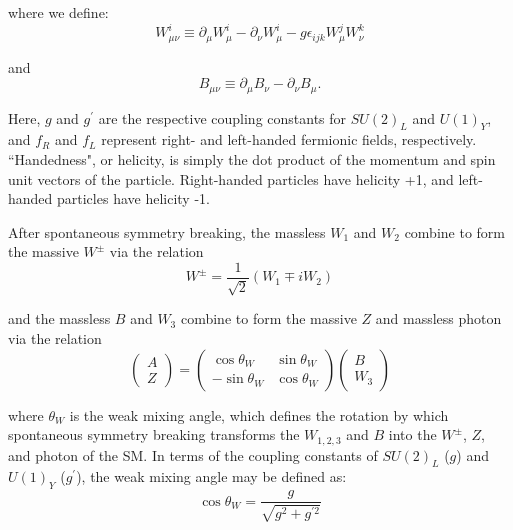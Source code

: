 \noindent where we define:
\begin{equation}
W^{i}_{\mu\nu} \equiv \partial_{\mu}W^{i}_{\mu} - \partial_{\nu}W^{i}_{\mu} - g\epsilon_{ijk}W^{j}_{\mu}W^{k}_{\nu}
\end{equation}

\noindent and
\begin{equation}
B_{\mu\nu} \equiv \partial_{\mu}B_{\nu} - \partial_{\nu}B_{\mu}.
\end{equation}

Here, $g$ and $g^{\prime}$ are the respective coupling constants for $SU(2)_{L}$ and $U(1)_{Y}$, and $f_{R}$ and $f_{L}$ represent right- and left-handed fermionic fields, respectively. ``Handedness", or helicity, is simply the dot product of the momentum and spin unit vectors of the particle. Right-handed particles have helicity +1, and left-handed particles have helicity -1.

After spontaneous symmetry breaking, the massless $W_{1}$ and $W_{2}$ combine to form the massive $W^{\pm}$ via the relation
\begin{equation}
W^{\pm} = \frac{1}{\sqrt{2}}\left(W_{1} \mp iW_{2}\right)
\end{equation}

\noindent and the massless $B$ and $W_{3}$ combine to form the massive $Z$ and massless photon via the relation
\begin{equation}
\begin{pmatrix}A \\Z\end{pmatrix}=\begin{pmatrix}\cos \theta _{W}&\sin \theta _{W}\\-\sin \theta _{W}&\cos \theta _{W}\end{pmatrix}\begin{pmatrix}B\\W_{3}\end{pmatrix}
\end{equation}

\noindent where $\theta_{W}$ is the weak mixing angle, which defines the rotation by which spontaneous symmetry breaking transforms the $W_{1,2,3}$ and $B$ into the $W^{\pm}$, $Z$, and photon of the SM. In terms of the coupling constants of $SU(2)_{L}$ ($g$) and $U(1)_{Y}$ ($g^\prime$), the weak mixing angle may be defined as\cite{srednicki}:
\begin{equation}
\cos \theta_{W} = \frac{g}{\sqrt{g^{2} + g^{\prime2}}}
\end{equation}

